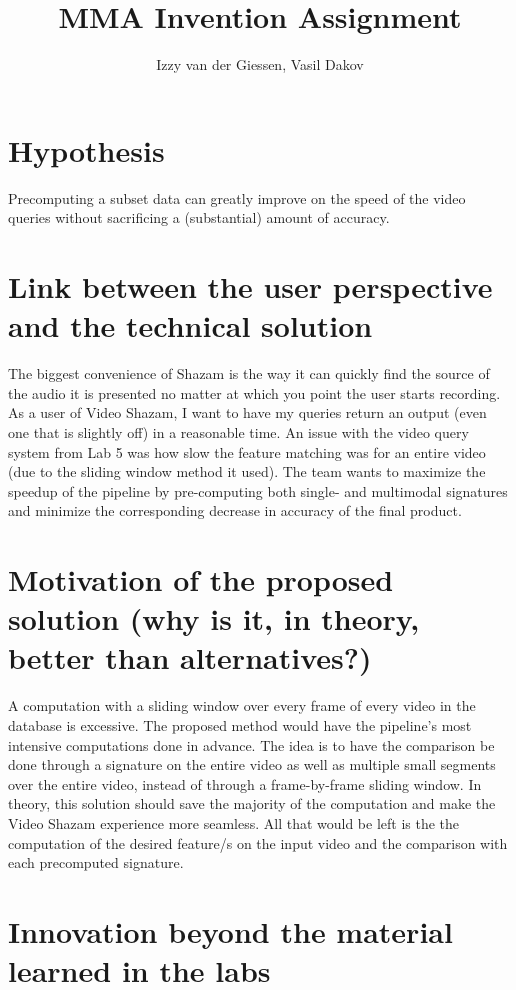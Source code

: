 \documentclass{article}
\title{MMA Invention Assignment}
\author{Izzy van der Giessen, Vasil Dakov}
\newcommand\tab[1][1cm]{\hspace*{#1}}
\begin{document}
\maketitle

\section*{Hypothesis}
\tab Precomputing a subset data can greatly improve on the speed of the video queries without sacrificing a (substantial) amount of accuracy.

\section*{Link between the user perspective and the technical solution}
\tab The biggest convenience of Shazam is the way it can quickly find the source of the audio it is presented no matter at which you point the user starts recording. As a user of Video Shazam, I want to have my queries return an output (even one that is slightly off) in a reasonable time. An issue with the video query system from Lab 5 was how slow the feature matching was for an entire video (due to the sliding window method it used). The team wants to maximize the speedup of the pipeline by pre-computing both single- and multimodal signatures and minimize the corresponding decrease in accuracy of the final product. 

\section*{Motivation of the proposed solution (why is it, in theory, better than alternatives?)}
\tab A computation with a sliding window over every frame of every video in the database is excessive. The proposed method would have the pipeline's most intensive computations done in advance. The idea is to have the comparison be done through a signature on the entire video as well as multiple small segments over the entire video, instead of through a frame-by-frame sliding window. In theory, this solution should save the majority of the computation and make the Video Shazam experience more seamless. All that would be left is the the computation of the desired feature/s on the input video and the comparison with each precomputed signature. 

\section*{Innovation beyond the material learned in the labs}
\end{document}
